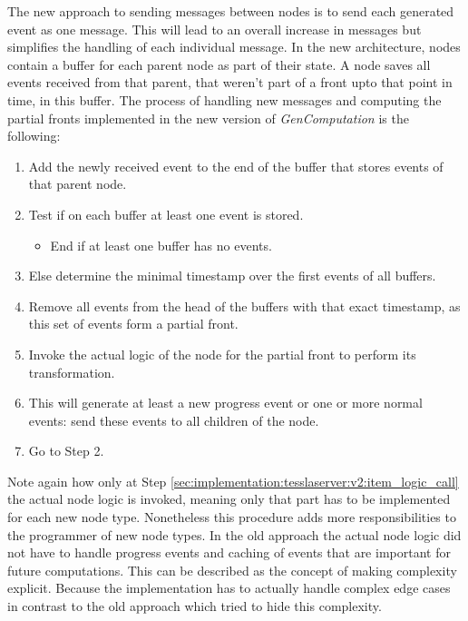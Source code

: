 The new approach to sending messages between nodes is to send each generated event as one message.
This will lead to an overall increase in messages but simplifies the handling of each individual message.
In the new architecture, nodes contain a buffer for each parent node as part of their state.
A node saves all events received from that parent, that weren't part of a front upto that point in time, in this buffer.
The process of handling new messages and computing the partial fronts implemented in the new version of \emph{GenComputation} is the following:

\begin{enumerate}
  \item Add the newly received event to the end of the buffer that stores events of that parent node.
  \item Test if on each buffer at least one event is stored.
    \begin{itemize}
      \item End if at least one buffer has no events.
    \end{itemize}
  \item Else determine the minimal timestamp over the first events of all buffers.
  \item Remove all events from the head of the buffers with that exact timestamp, as this set of events form a partial front.
  \item\label{sec:implementation:tesslaserver:v2:item_logic_call} Invoke the actual logic of the node for the partial front to perform its transformation.
  \item This will generate at least a new progress event or one or more normal events: send these events to all children of the node.
  \item Go to Step 2.
\end{enumerate}

Note again how only at Step \ref{sec:implementation:tesslaserver:v2:item_logic_call} the actual node logic is invoked, meaning only that part has to be implemented for each new node type.
Nonetheless this procedure adds more responsibilities to the programmer of new node types.
In the old approach the actual node logic did not have to handle progress events and caching of events that are important for future computations.
This can be described as the concept of making complexity explicit.
Because the implementation has to actually handle complex edge cases in contrast to the old approach which tried to hide this complexity.

